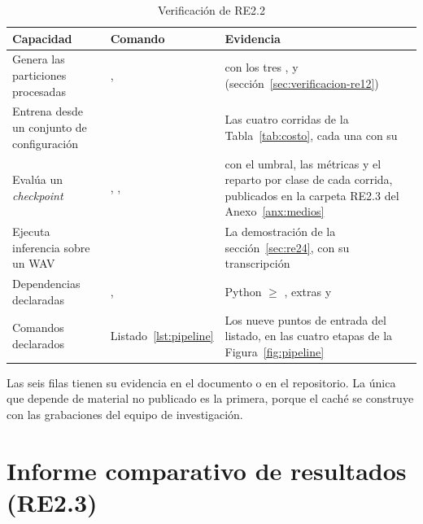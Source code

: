 \begin{table}[htbp]
    \centering
    \small
    \begin{threeparttable}
        \caption{Verificación de RE2.2}
        \label{tab:verificacion-re22}
        \begin{tabular}{@{}L{3.3cm}L{4.6cm}L{5.5cm}@{}}
            \toprule
            \textbf{Capacidad} & \textbf{Comando} & \textbf{Evidencia} \\
            \midrule
            Genera las particiones procesadas & ,  &  con los tres ,  y  (sección~\ref{sec:verificacion-re12}) \\
            Entrena desde un conjunto de configuración &  & Las cuatro corridas de la Tabla~\ref{tab:costo}, cada una con su  \\
            Evalúa un \textit{checkpoint} & , ,  &  con el umbral, las métricas y el reparto por clase de cada corrida, publicados en la carpeta RE2.3 del Anexo~\ref{anx:medios} \\
            Ejecuta inferencia sobre un WAV &  & La demostración de la sección~\ref{sec:re24}, con su transcripción \\
            Dependencias declaradas & ,  & Python $\geq$ \rPython{}, extras  y  \\
            Comandos declarados & Listado~\ref{lst:pipeline} & Los nueve puntos de entrada del listado, en las cuatro etapas de la Figura~\ref{fig:pipeline} \\
            \bottomrule
        \end{tabular}
    \end{threeparttable}
\end{table}

Las seis filas tienen su evidencia en el documento o en el repositorio. La única
que depende de material no publicado es la primera, porque el caché se construye
con las grabaciones del equipo de investigación.

\section{Informe comparativo de resultados (RE2.3)}
\label{sec:re23}
\label{sec:resultados-deteccion}

